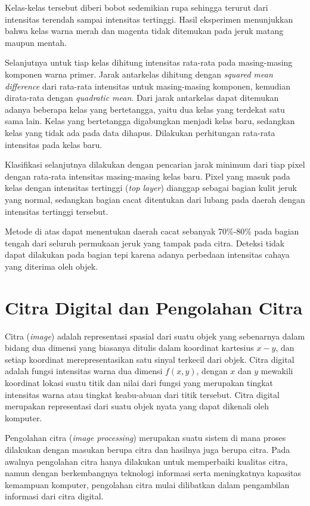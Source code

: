 \documentclass[laporan.tex]{subfiles}
\begin{document}
Kelas-kelas tersebut diberi bobot sedemikian rupa sehingga terurut dari intensitas terendah sampai intensitas tertinggi. Hasil eksperimen menunjukkan bahwa kelas warna merah dan magenta tidak ditemukan pada jeruk matang maupun mentah.

Selanjutnya untuk tiap kelas dihitung intensitas rata-rata pada masing-masing komponen warna primer. Jarak antarkelas dihitung dengan \emph{squared mean difference} dari rata-rata intensitas untuk masing-masing komponen, kemudian dirata-rata dengan \emph{quadratic mean}. Dari jarak antarkelas dapat ditemukan adanya beberapa kelas yang bertetangga, yaitu dua kelas yang terdekat satu sama lain. Kelas yang bertetangga digabungkan menjadi kelas baru, sedangkan kelas yang tidak ada pada data dihapus. Dilakukan perhitungan rata-rata intensitas pada kelas baru.

Klasifikasi selanjutnya dilakukan dengan pencarian jarak minimum dari tiap pixel dengan rata-rata intensitas masing-masing kelas baru. Pixel yang masuk pada kelas dengan intensitas tertinggi (\emph{top layer}) dianggap sebagai bagian kulit jeruk yang normal, sedangkan bagian cacat ditentukan dari lubang pada daerah dengan intensitas tertinggi tersebut.

Metode di atas dapat menentukan daerah cacat sebanyak 70\%-80\% pada bagian tengah dari seluruh permukaan jeruk yang tampak pada citra. Deteksi tidak dapat dilakukan pada bagian tepi karena adanya perbedaan intensitas cahaya yang diterima oleh objek.

\section{Citra Digital dan Pengolahan Citra}

Citra (\emph{image}) adalah representasi spasial dari suatu objek yang sebenarnya dalam bidang dua dimensi yang biasanya ditulis dalam koordinat kartesius $x-y$, dan setiap koordinat merepresentasikan satu sinyal terkecil dari objek\cite{kulkarni}. Citra digital adalah fungsi intensitas warna dua dimensi $f(x,y)$, dengan $x$ dan $y$ mewakili koordinat lokasi suatu titik dan nilai dari fungsi yang merupakan tingkat intensitas warna atau tingkat keabu-abuan dari titik tersebut\cite{schalkoff}. Citra digital merupakan representasi dari suatu objek nyata yang dapat dikenali oleh komputer.

Pengolahan citra (\emph{image processing}) merupakan suatu sistem di mana proses dilakukan dengan masukan berupa citra dan hasilnya juga berupa citra\cite{basuki}. Pada awalnya pengolahan citra hanya dilakukan untuk memperbaiki kualitas citra, namun dengan berkembangnya teknologi informasi serta meningkatnya kapasitas kemampuan komputer, pengolahan citra mulai dilibatkan dalam pengambilan informasi dari citra digital.
\end{document}
